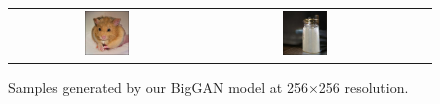 \begin{figure}[htbp]
\begin{tabular}{cccc}
\includegraphics[width=0.24\textwidth]{images/samples1/256hamster0.jpg} & 
\includegraphics[width=0.24\textwidth]{images/samples1/256saltshaker0.jpg} \\
\end{tabular}
\caption{Samples generated by our BigGAN model at 256$\times$256 resolution.}
\label{appendix_samples256}
\end{figure}


